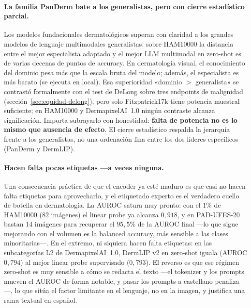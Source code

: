 \paragraph{La familia PanDerm bate a los generalistas, pero con cierre
estadístico parcial.}
\label{sec:disc-llm}
Los modelos fundacionales dermatológicos superan con claridad a los
grandes modelos de lenguaje multimodales generalistas: sobre HAM10000 la
distancia entre el mejor especialista adaptado y el mejor LLM multimodal
en zero-shot es de varias decenas de puntos de accuracy. En dermatología
visual, el conocimiento del dominio pesa más que la escala bruta del
modelo; además, el especialista es más barato (se ejecuta en local). Esa
superioridad «dominio $>$ generalista» se contrastó formalmente con el
test de DeLong sobre tres endpoints de malignidad
(sección~\ref{sec:equidad-delong}), pero solo Fitzpatrick17k tiene
potencia muestral suficiente; en HAM10000 y DermapixelAI~1.0 ningún
contraste alcanza significación. Importa subrayarlo con honestidad:
\textbf{falta de potencia no es lo mismo que ausencia de efecto}. El
cierre estadístico respalda la jerarquía frente a los generalistas, no
una ordenación fina entre los dos líderes específicos (PanDerm y
DermLIP).

\paragraph{Hacen falta pocas etiquetas ---a veces ninguna.}
\label{sec:disc-zs}
Una consecuencia práctica de que el encoder ya esté maduro es que casi no
hacen falta etiquetas para aprovecharlo, y el etiquetado experto es el
verdadero cuello de botella en dermatología. La AUROC satura muy pronto:
con el $1\%$ de HAM10000 ($82$ imágenes) el linear probe ya alcanza
$0{,}918$, y en PAD-UFES-20 bastan $14$ imágenes para recuperar el
$95{,}5\%$ de la AUROC final ---lo que sigue mejorando con el volumen es
la balanced accuracy, más sensible a las clases minoritarias---. En el
extremo, ni siquiera hacen falta etiquetas: en las subcategorías L2 de
DermapixelAI~1.0, DermLIP v2 en zero-shot iguala (AUROC $0{,}794$) al
mejor linear probe supervisado ($0{,}793$). El reverso es que ese régimen
zero-shot es muy sensible a cómo se redacta el texto ---el tokenizer y los
prompts mueven el AUROC de forma notable, y pasar los prompts a castellano
penaliza---, lo que sitúa el factor limitante en el lenguaje, no en la
imagen, y justifica una rama textual en español.

